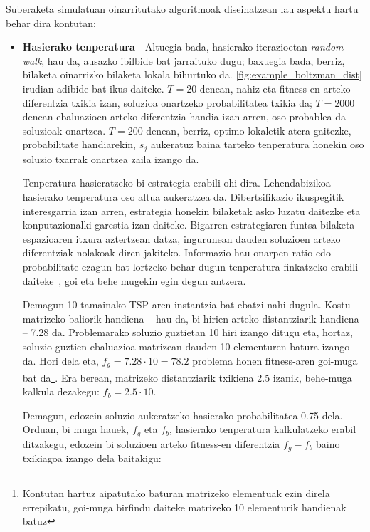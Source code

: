 \documentclass[eu]{ifirak}\usepackage[]{graphicx}\usepackage[]{color}
\begin{document}
Suberaketa simulatuan oinarritutako algoritmoak diseinatzean lau aspektu hartu behar dira kontutan:
\begin{itemize}
\item \textbf{Hasierako tenperatura} - Altuegia bada, hasierako iterazioetan \textit{random walk}, hau da, ausazko ibilbide bat jarraituko dugu; baxuegia bada, berriz, bilaketa oinarrizko bilaketa lokala bihurtuko da. \ref{fig:example_boltzman_dist} irudian adibide bat ikus daiteke. $T=20$ denean, nahiz eta fitness-en arteko diferentzia txikia izan, soluzioa onartzeko probabilitatea txikia da; $T=2000$ denean ebaluazioen arteko diferentzia handia izan arren, oso probablea da soluzioak onartzea. $T=200$ denean, berriz, optimo lokaletik atera gaitezke, probabilitate handiarekin, $s_j$ aukeratuz baina tarteko tenperatura honekin oso soluzio txarrak onartzea zaila izango da. 

Tenperatura hasieratzeko bi estrategia erabili ohi dira. Lehendabizikoa hasierako tenperatura oso altua aukeratzea da. Dibertsifikazio ikuspegitik interesgarria izan arren, estrategia honekin bilaketak asko luzatu daitezke eta konputazionalki garestia izan daiteke.  Bigarren estrategiaren funtsa bilaketa espazioaren itxura aztertzean datza, ingurunean dauden soluzioen arteko diferentziak nolakoak diren jakiteko. Informazio hau onarpen ratio edo probabilitate ezagun bat lortzeko behar dugun tenperatura finkatzeko erabili daiteke~\cite{huang1986,aarts1987}, goi eta behe mugekin egin degun antzera.


\begin{tcolorbox}
\begin{ifexample}
Demagun 10 tamainako TSP-aren instantzia bat ebatzi nahi dugula. Kostu matrizeko baliorik handiena -- hau da, bi hirien arteko distantziarik handiena -- 7.28 da. Problemarako soluzio guztietan 10 hiri izango ditugu eta, hortaz, soluzio guztien ebaluazioa matrizean dauden 10 elementuren batura izango da. Hori dela eta, $f_g=7.28 \cdot 10=78.2$ problema honen fitness-aren goi-muga bat da\footnote{Kontutan hartuz aipatutako baturan matrizeko elementuak ezin direla errepikatu, goi-muga birfindu daiteke matrizeko 10 elementurik handienak batuz}. Era berean, matrizeko distantziarik txikiena 2.5 izanik, behe-muga kalkula dezakegu: $f_b = 2.5\cdot 10$. 

Demagun, edozein soluzio aukeratzeko hasierako probabilitatea 0.75 dela. Orduan, bi muga hauek, $f_g$ eta $f_b$, hasierako tenperatura kalkulatzeko erabil ditzakegu, edozein bi soluzioen arteko fitness-en diferentzia $f_g-f_b$ baino txikiagoa izango dela baitakigu:


\end{ifexample}
\end{tcolorbox}
\end{itemize}
\end{document}
